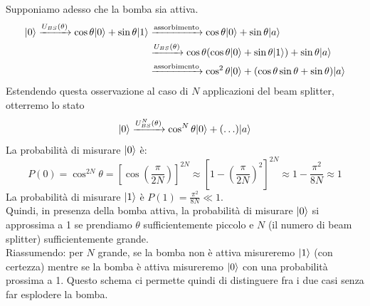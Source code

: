 \documentclass[12pt, a4paper]{report}
\begin{document}
Supponiamo adesso che la bomba sia attiva.
\begin{equation*}
    \begin{split}
        | 0 \rangle \xrightarrow{U_{BS}(\theta)} \cos\theta| 0 \rangle+\sin\theta| 1 \rangle &\xrightarrow{\text{assorbimento}} \cos\theta| 0 \rangle+\sin\theta| a \rangle \\ 
        &\xrightarrow{U_{BS}(\theta)} \cos\theta(\cos\theta| 0 \rangle+\sin\theta| 1 \rangle)+\sin\theta| a \rangle \\
        &\xrightarrow{\text{assorbimento}} \cos^{2}\theta| 0 \rangle+(\cos\theta\sin\theta+\sin\theta)| a \rangle
    \end{split}
\end{equation*}
Estendendo questa osservazione al caso di $N$ applicazioni del beam splitter, otterremo lo stato
\begin{equation*}
    | 0 \rangle\xrightarrow{U_{BS}^{N}(\theta)} \cos^{N}\theta| 0 \rangle+(\ldots)| a \rangle
\end{equation*}
La probabilità di misurare $| 0 \rangle$ è:
\begin{equation*}
    P(0) = \cos^{2N}\theta = \left[\cos\left(\frac{\pi}{2N}\right)\right]^{2N} \approx \left[1-\left(\frac{\pi}{2N}\right)^{2}\right]^{2N} \approx 1-\frac{\pi^{2}}{8N} \approx 1
\end{equation*}
La probabilità di misurare $| 1 \rangle$ è $P(1)=\frac{\pi^{2}}{8N}\ll 1$.\\
Quindi, in presenza della bomba attiva, la probabilità di misurare $| 0 \rangle$ si approssima a 1 se prendiamo $\theta$ sufficientemente piccolo e $N$ (il numero di beam splitter) sufficientemente grande.\\
Riassumendo: per $N$ grande, se la bomba non è attiva misureremo $| 1 \rangle$ (con certezza) mentre se la bomba è attiva misureremo $| 0 \rangle$ con una probabilità prossima a 1. Questo schema ci permette quindi di distinguere fra i due casi senza far esplodere la bomba.
\end{document}
